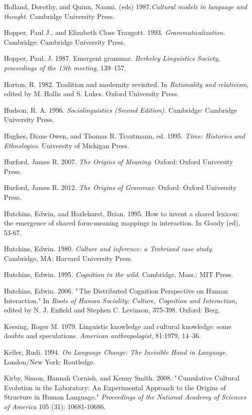 Holland, Dorothy, and Quinn, Naomi. (eds) 1987.\textit{Cultural models 
in language and thought}. Cambridge University Press.

Hopper, Paul J., and Elizabeth Closs Traugott. 1993. \textit{
Grammaticalization}. Cambridge: Cambridge University Press.

Hopper, Paul. J. 1987. Emergent grammar. \textit{Berkeley Linguistics 
Society, proceedings of the 13th meeting}, 139--157.

Horton, R. 1982. Tradition and modernity revisited. In \textit{
Rationality and relativism}, edited by M. Hollis and S. Lukes. Oxford 
University Press.

Hudson, R. A. 1996. \textit{Sociolinguistics (Second Edition)}. 
Cambridge: Cambridge University Press.

Hughes, Diane Owen, and Thomas R. Trautmann, ed. 1995. \textit{Time: 
Histories and Ethnologies}. University of Michigan Press.

Hurford, James R. 2007. \textit{The Origins of Meaning}. Oxford: 
Oxford University Press.

Hurford, James R. 2012. \textit{The Origins of Grammar}. Oxford: 
Oxford University Press.

Hutchins, Edwin, and Hazlehurst, Brian. 1995. How to invent a shared 
lexicon: the emergence of shared form-meaning mappings in interaction. 
In Goody (ed), 53-67.

Hutchins, Edwin. 1980. \textit{Culture and inference: a Trobriand case 
study.} Cambridge, MA: Harvard University Press.

Hutchins, Edwin. 1995. \textit{Cognition in the wild}. Cambridge, 
Mass.: MIT Press.

Hutchins, Edwin. 2006. "\,The Distributed Cognition Perspective on Human 
Interaction." In \textit{Roots of Human Sociality: Culture, Cognition 
and Interaction}, edited by N. J. Enfield and Stephen C. Levinson, 
375-398. Oxford: Berg.

Keesing, Roger M. 1979. Linguistic knowledge and cultural knowledge: 
some doubts and speculations. \textit{American anthropologist}, 
81:1979, 14--36.

Keller, Rudi. 1994. \textit{On Language Change: The Invisible Hand in 
Language}. London/New York: Routledge.

Kirby, Simon, Hannah Cornish, and Kenny Smith. 2008. "\,Cumulative 
Cultural Evolution in the Laboratory: An Experimental Approach to the 
Origins of Structure in Human Language." \textit{Proceedings of the 
National Academy of Sciences of America} 105 (31): 10681-10686.

